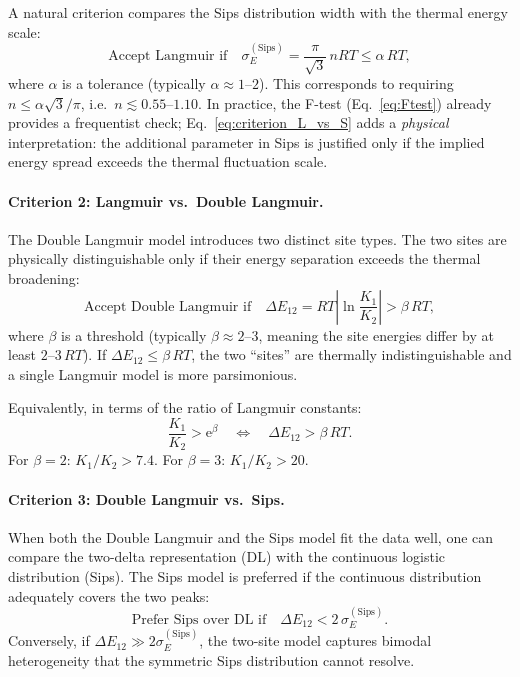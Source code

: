 \documentclass[12pt]{article}
\begin{document}
	A natural criterion compares the Sips distribution width with the
	thermal energy scale:
	\begin{equation}
		\boxed{
			\text{Accept Langmuir if}\quad
			\sigma_E^{\mathrm{(Sips)}}
			= \frac{\pi}{\sqrt{3}}\,nRT
			\leq \alpha\, RT,
		}
		\label{eq:criterion_L_vs_S}
	\end{equation}
	where $\alpha$ is a tolerance (typically $\alpha \approx 1$--$2$).
	This corresponds to requiring $n \leq \alpha\sqrt{3}/\pi$, i.e.\
	$n \lesssim 0.55$--$1.10$. In practice, the F-test
	(Eq.~\eqref{eq:Ftest}) already provides a frequentist check;
	Eq.~\eqref{eq:criterion_L_vs_S} adds a \emph{physical}
	interpretation: the additional parameter in Sips is justified only
	if the implied energy spread exceeds the thermal fluctuation scale.

	\paragraph{Criterion 2: Langmuir vs.\ Double Langmuir.}

	The Double Langmuir model introduces two distinct site types.
	The two sites are physically distinguishable only if their
	energy separation exceeds the thermal broadening:
	\begin{equation}
		\boxed{
			\text{Accept Double Langmuir if}\quad
			\Delta E_{12}
			= RT\left|\ln\frac{K_1}{K_2}\right|
			> \beta\, RT,
		}
		\label{eq:criterion_L_vs_DL}
	\end{equation}
	where $\beta$ is a threshold (typically $\beta \approx 2$--$3$,
	meaning the site energies differ by at least $2$--$3\,RT$).
	If $\Delta E_{12} \leq \beta\,RT$, the two ``sites'' are
	thermally indistinguishable and a single Langmuir model is
	more parsimonious.

	Equivalently, in terms of the ratio of Langmuir constants:
	\begin{equation}
		\frac{K_1}{K_2} > \mathrm{e}^{\beta}
		\quad\Longleftrightarrow\quad
		\Delta E_{12} > \beta\, RT.
	\end{equation}
	For $\beta = 2$: $K_1/K_2 > 7.4$. For $\beta = 3$:
	$K_1/K_2 > 20$.

	\paragraph{Criterion 3: Double Langmuir vs.\ Sips.}

	When both the Double Langmuir and the Sips model fit the data
	well, one can compare the two-delta representation (DL) with the
	continuous logistic distribution (Sips). The Sips model is
	preferred if the continuous distribution adequately covers the
	two peaks:
	\begin{equation}
		\boxed{
			\text{Prefer Sips over DL if}\quad
			\Delta E_{12} < 2\,\sigma_E^{\mathrm{(Sips)}}.
		}
		\label{eq:criterion_DL_vs_S}
	\end{equation}
	Conversely, if $\Delta E_{12} \gg 2\sigma_E^{\mathrm{(Sips)}}$,
	the two-site model captures bimodal heterogeneity that the
	symmetric Sips distribution cannot resolve.
\end{document}
